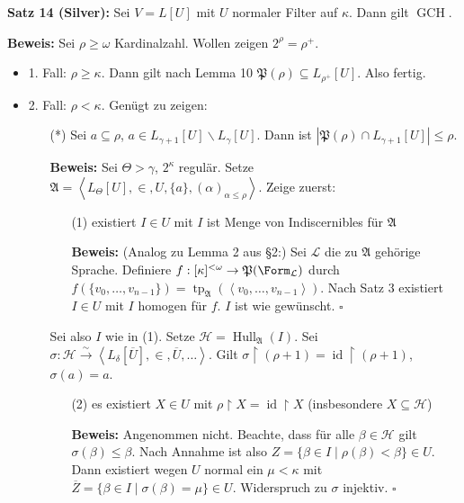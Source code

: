 \documentclass[a4paper,fontsize=11pt]{scrartcl}
\newcommand{\GCH}{\operatorname{GCH}}
\newcommand{\id}{\operatorname{id}}
\newcommand{\tp}{\operatorname{tp}}
\newcommand{\Hull}{\operatorname{Hull}}
\renewcommand{\bar}[1]{\overline{#1}}
\begin{document}

{\bf Satz 14 (Silver):} Sei $V=L[U]$ mit $U$ normaler Filter auf
$\kappa$. Dann gilt $\GCH$.

{\bf Beweis:} Sei $\rho\ge\omega$ Kardinalzahl. Wollen zeigen $2^\rho = \rho^+$.
\begin{itemize}
  \item 1. Fall: $\rho\ge\kappa$. Dann gilt nach Lemma 10 $\mathfrak{P}(\rho)\subseteq L_{\rho^+}[U]$. Also fertig.
  \item 2. Fall: $\rho<\kappa$. Genügt zu zeigen:
    \begin{itemize}
      \item[(*)] Sei $a\subseteq\rho$, $a\in L_{\gamma+1}[U]\backslash L_\gamma[U]$. Dann ist $|\mathfrak{P}(\rho)\cap L_{\gamma+1}[U]|\le\rho$.
      \item[] {\bf Beweis:} Sei $\Theta>\gamma$, $2^\kappa$ regulär. Setze $\mathfrak{A}=\left<L_\Theta[U], \in, U, \{a\},
        (\alpha)_{\alpha\le\rho}\right>$. Zeige zuerst:
        \begin{itemize}
          \item[(1)] existiert $I\in U$ mit $I$ ist Menge von Indiscernibles für $\mathfrak{A}$
          \item[] {\bf Beweis:} (Analog zu Lemma 2 aus §2:) Sei $\mathcal{L}$ die zu $\mathfrak{A}$ gehörige Sprache. Definiere
            $f:[\kappa]^{<\omega}\rightarrow \mathfrak{P}(\Form_{\mathcal{L}})$ durch $f(\{v_0, \ldots, v_{n-1}\})=\tp_{\mathfrak{A}}(\left<v_0,
            \ldots, v_{n-1}\right>)$. Nach Satz 3 existiert $I\in U$ mit $I$ homogen für $f$. $I$ ist wie gewünscht. \hfill $\square$
        \end{itemize}
        Sei also $I$ wie in (1). Setze $\mathcal{H} = \Hull_{\mathfrak{A}}(I)$. Sei $\sigma:\mathcal{H}\xrightarrow{\sim}\left< L_\delta[\bar{U}],
        \in, \bar{U}, \ldots\right>$. Gilt $\sigma\upharpoonright(\rho+1)=\id\upharpoonright(\rho+1)$, $\sigma(a)=a$.
        \begin{itemize}
          \item[(2)] es existiert $X\in U$ mit $\rho\upharpoonright X = \id\upharpoonright X$ (insbesondere $X\subseteq\mathcal{H}$)
          \item[] {\bf Beweis:} Angenommen nicht. Beachte, dass für alle $\beta\in\mathcal{H}$ gilt $\sigma(\beta)\le\beta$. Nach Annahme ist also
            $Z=\{\beta\in I\mid\rho(\beta)<\beta\}\in U$. Dann existiert wegen $U$ normal ein $\mu<\kappa$ mit $\bar{Z}=\{\beta\in I\mid
            \sigma(\beta)=\mu\}\in U$. Widerspruch zu $\sigma$ injektiv. \hfill $\square$

\end{itemize}
\end{itemize}
\end{itemize}
\end{document}
